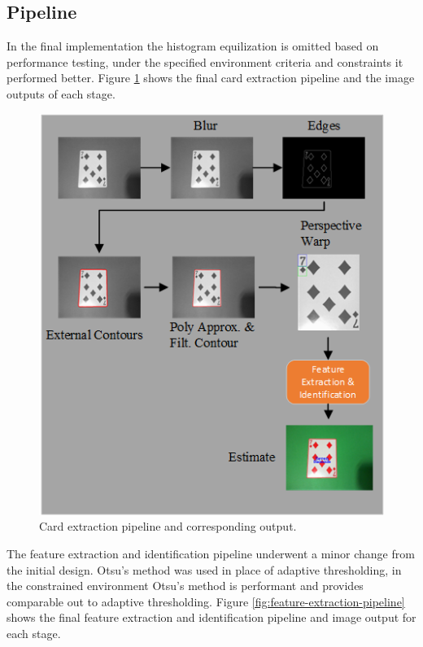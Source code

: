 \documentclass[conference]{IEEEtran}
\begin{document}
\subsection{Pipeline}
In the final implementation the histogram equilization is omitted based on performance testing, under
the specified environment criteria and constraints it performed better. Figure
\ref{fig:extraction-pipeline} shows the final card extraction pipeline and the image outputs of each
stage.

\begin{figure}[htbp]
\centerline{\includegraphics[width=\columnwidth]{ActualCardExtraction.png}}
\caption{Card extraction pipeline and corresponding output.}
\label{fig:extraction-pipeline}
\end{figure}

The feature extraction and identification pipeline underwent a minor change from the initial design.
Otsu's method was used in place of adaptive thresholding, in the constrained environment Otsu's
method is performant and provides comparable out to adaptive thresholding. Figure
\ref{fig:feature-extraction-pipeline} shows the final feature extraction and identification pipeline
and image output for each stage.
\end{document}
